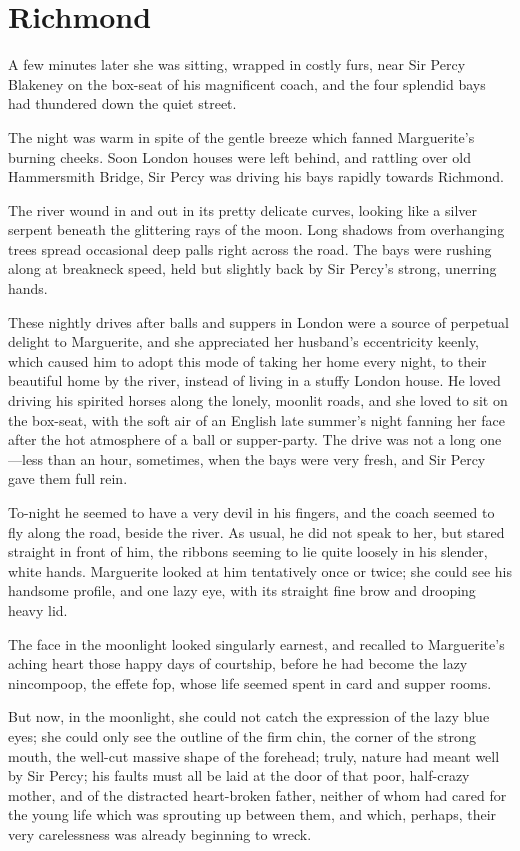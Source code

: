 
\chapter{Richmond}
\lettrine[lines=4]{A}{} few minutes later she was sitting, wrapped in costly furs, near Sir Percy Blakeney on the box-seat of his magnificent coach, and the four splendid bays had thundered down the quiet street.

The night was warm in spite of the gentle breeze which fanned Marguerite's burning cheeks. Soon London houses were left behind, and rattling over old Hammersmith  Bridge, Sir Percy was driving his bays rapidly towards Richmond.

The river wound in and out in its pretty delicate curves, looking like a silver serpent beneath the glittering rays of the moon. Long shadows from overhanging trees spread occasional deep palls right across the road. The bays were rushing along at breakneck speed, held but slightly back by Sir Percy's strong, unerring hands.

These nightly drives after balls and suppers in London were a source of perpetual delight to Marguerite, and she appreciated her husband's eccentricity keenly, which caused him to adopt this mode of taking her home every night, to their beautiful home by the river, instead of living in a stuffy London house. He loved driving his spirited horses along the lonely, moonlit roads, and she loved to sit on the box-seat, with the soft air of an English late summer's night fanning her face after the hot atmosphere of a ball or supper-party. The drive was not a long one---less than an hour, sometimes, when the bays were very fresh, and Sir Percy gave them full rein.

To-night he seemed to have a very devil in his fingers, and the coach seemed to fly along the road, beside the river. As usual, he did not speak to her, but stared straight in front of him, the ribbons seeming to lie quite loosely in his slender, white hands. Marguerite looked at him tentatively once or twice; she could see his handsome profile, and one lazy eye, with its straight fine brow and drooping heavy lid.

The face in the moonlight looked singularly earnest, and recalled to Marguerite's aching heart those happy days of courtship, before he had become the lazy nincompoop, the effete fop, whose life seemed spent in card and supper rooms.

But now, in the moonlight, she could not catch the expression of the lazy blue eyes; she could only see the outline of the firm chin, the corner of the strong mouth, the well-cut massive shape of the forehead; truly, nature had meant well by Sir Percy; his faults must all be laid at the door of that poor, half-crazy mother, and of the distracted heart-broken father, neither of whom had cared for the young life which was sprouting up between them, and which, perhaps, their very carelessness was already beginning to wreck.

